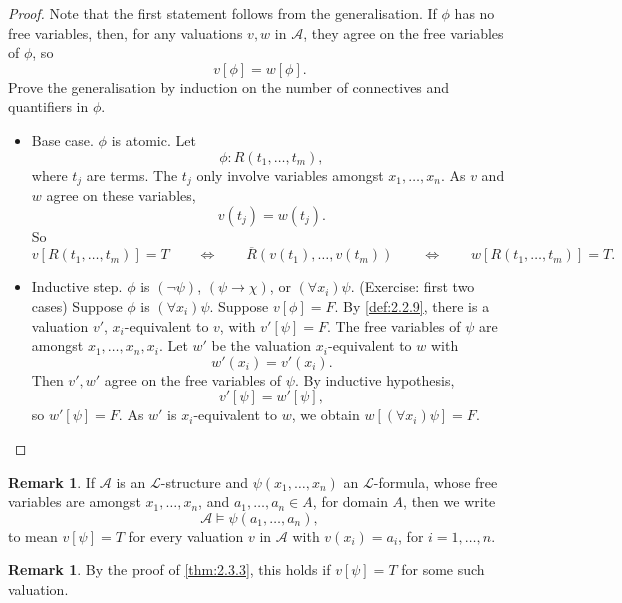 \documentclass{article}
\newcommand{\A}{\mathcal{A}}
\renewcommand{\L}{\mathcal{L}}
\newcommand{\rb}[1]{\left( #1 \right)}
\renewcommand{\sb}[1]{\left[ #1 \right]}
\newcommand{\notb}[1]{\rb{\neg #1}}
\newcommand{\impb}[2]{\rb{#1 \rightarrow #2}}
\newcommand{\fab}[1]{\rb{\forall #1}}
\theoremstyle{definition}\newtheorem{definition}{Definition}[subsection]
\theoremstyle{definition}\newtheorem{remark1}[definition]{Remark}
\theoremstyle{definition}\newtheorem{example1}[definition]{Example}
\theoremstyle{definition}\newtheorem*{remark2}{Remark}
\theoremstyle{definition}\newtheorem*{example2}{Example}
\theoremstyle{definition}\newtheorem*{note}{Note}
\theoremstyle{definition}\newtheorem*{notation}{Notation}
\begin{document}
\begin{proof}
Note that the first statement follows from the generalisation. If $ \phi $ has no free variables, then, for any valuations $ v, w $ in $ \A $, they agree on the free variables of $ \phi $, so
$$ v\sb{\phi} = w\sb{\phi}. $$
Prove the generalisation by induction on the number of connectives and quantifiers in $ \phi $.
\begin{itemize}
\item Base case. $ \phi $ is atomic. Let
$$ \phi : R\rb{t_1, \dots, t_m}, $$
where $ t_j $ are terms. The $ t_j $ only involve variables amongst $ x_1, \dots, x_n $. As $ v $ and $ w $ agree on these variables,
$$ v\rb{t_j} = w\rb{t_j}. $$
So
$$ v\sb{R\rb{t_1, \dots, t_m}} = T \qquad \iff \qquad \overline{R}\rb{v\rb{t_1}, \dots, v\rb{t_m}} \qquad \iff \qquad w\sb{R\rb{t_1, \dots, t_m}} = T. $$
\item Inductive step. $ \phi $ is $ \notb{\psi} $, $ \impb{\psi}{\chi} $, or $ \fab{x_i}\psi $. (Exercise: first two cases) Suppose $ \phi $ is $ \fab{x_i}\psi $. Suppose $ v\sb{\phi} = F $. By \ref{def:2.2.9}, there is a valuation $ v' $, $ x_i $-equivalent to $ v $, with $ v'\sb{\psi} = F $. The free variables of $ \psi $ are amongst $ x_1, \dots, x_n, x_i $. Let $ w' $ be the valuation $ x_i $-equivalent to $ w $ with
$$ w'\rb{x_i} = v'\rb{x_i}. $$
Then $ v', w' $ agree on the free variables of $ \psi $. By inductive hypothesis,
$$ v'\sb{\psi} = w'\sb{\psi}, $$
so $ w'\sb{\psi} = F $. As $ w' $ is $ x_i $-equivalent to $ w $, we obtain $ w\sb{\fab{x_i}\psi} = F $.
\end{itemize}
\end{proof}


\begin{remark1}
If $ \A $ is an $ \L $-structure and $ \psi\rb{x_1, \dots, x_n} $ an $ \L $-formula, whose free variables are amongst $ x_1, \dots, x_n $, and $ a_1, \dots, a_n \in A $, for domain $ A $, then we write
$$ \A \vDash \psi\rb{a_1, \dots, a_n}, $$
to mean $ v\sb{\psi} = T $ for every valuation $ v $ in $ \A $ with $ v\rb{x_i} = a_i $, for $ i = 1, \dots, n $.
\end{remark1}

\begin{remark2}
By the proof of \ref{thm:2.3.3}, this holds if $ v\sb{\psi} = T $ for some such valuation.
\end{remark2}
\end{document}

